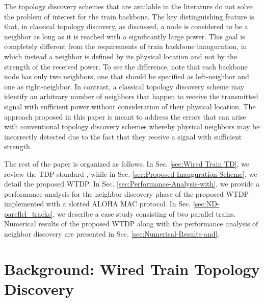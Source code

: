 \documentclass[10pt,english,two column]{IEEEtran}
\begin{document}
The topology discovery schemes that are available in the literature
do not solve the problem of interest for the train backbone. The key
distinguishing feature is that, in classical topology discovery, as
discussed, a node is considered to be a neighbor as long as it is
reached with a significantly large power. This goal is completely
different from the requirements of train backbone inauguration, in
which instead a neighbor is defined by its physical location and not
by the strength of the received power. To see the difference, note
that each backbone node has only two neighbors, one that should be
specified as left-neighbor and one as right-neighbor. In contrast,
a classical topology discovery scheme may identify an arbitrary number
of neighbors that happen to receive the transmitted signal with sufficient
power without consideration of their physical location. The approach
proposed in this paper is meant to address the errors that can arise
with conventional topology discovery schemes whereby physical neighbors
may be incorrectly detected due to the fact that they receive a signal
with sufficient strength.

The rest of the paper is organized as follows. In Sec. \ref{sec:Wired Train TD},
we review the TDP standard \cite{IEC 61375}, while in Sec. \ref{sec:Proposed-Inauguration-Scheme},
we detail the proposed WTDP. In Sec. \ref{sec:Performance-Analysis-with},
we provide a performance analysis for the neighbor discovery phase
of the proposed WTDP implemented with a slotted ALOHA MAC protocol.
In Sec. \ref{sec:ND-parellel_tracks}, we describe a case study consisting
of two parallel trains. Numerical results of the proposed WTDP along
with the performance analysis of neighbor discovery are presented
in Sec. \ref{sec:Numerical-Results-and}.


\section{Background: Wired Train Topology Discovery\label{sec:Wired Train TD}}
\end{document}
